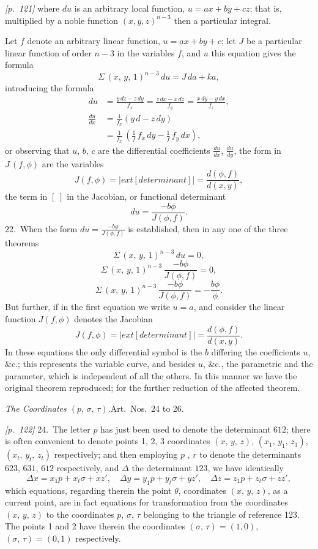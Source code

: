 \documentclass[11pt,a4paper]{article}
\theoremstyle{plain}
\theoremstyle{definition}
\theoremstyle{remark}
\begin{document}
\bigskip\noindent\textit{[p.~121]} where $du$ is an arbitrary local function, $u = ax + by + cz$; that is, multiplied by a noble function $(x, y, z)^{n-3}$ then a particular integral.

Let $f$ denote an arbitrary linear function, $u = ax + by + c$; let $J$ be a particular linear function of order $n - 3$ in the variables $f$, and $u$ this equation gives the formula
\[
\Sigma\,(x,\,y,\,1)^{n-3}\,du = J\,da + ka,
\]
introducing the formula
\begin{align*}
du &= \frac{y\,dz - z\,dy}{f_x} = \frac{z\,dx - x\,dz}{f_y} = \frac{x\,dy - y\,dx}{f_z},\\
\frac{du}{dx} &= \frac{1}{f_x}(y\,d - z\,dy)\\
&= \frac{1}{f_x}\,\left(\frac{1}{f}\,f_x\,dy - \frac{1}{f}\,f_y\,dx\right),
\end{align*}
or observing that $u$, $b$, $c$ are the differential coefficients $\frac{du}{dx}$, $\frac{du}{dy}$, the form in $J\,(f, \phi)$ are the variables
\[
J(f, \phi) =
\left|
	ext{[determinant]}
\right| = \frac{d(\phi, f)}{d(x, y)},
\]
the term in $[\;]$ in the Jacobian, or functional determinant
\[
du = \frac{-b\phi}{J(\phi, f)}.
\]
22.\ When the form $du = \frac{-b\phi}{J(\phi, f)}$ is established, then in any one of the three theorems
\[
\Sigma\,(x,\,y,\,1)^{n-3}\,du = 0,
\]
\[
\Sigma\,(x,\,y,\,1)^{n-3}\,\frac{-b\phi}{J(\phi, f)} = 0,
\]
\[
\Sigma\,(x,\,y,\,1)^{n-3}\,\frac{-b\phi}{J(\phi, f)} = -\frac{b\phi}{\phi}.
\]
But further, if in the first equation we write $u = a$, and consider the linear function $J(f, \phi)$ denotes the Jacobian
\[
J(f, \phi) =
\left|
	ext{[determinant]}
\right| = \frac{d(\phi, f)}{d(x, y)}.
\]
In these equations the only differential symbol is the $b$ differing the coefficients $u$, \&c.; this represents the variable curve, and besides $u$, \&c., the parametric and the parameter, which is independent of all the others. In this manner we have the original theorem reproduced; for the further reduction of the affected theorem.

\bigskip

\textit{The Coordinates $(p,\,\sigma,\,\tau)$.}\quad Art.\ Nos.~24 to 26.

\noindent\textit{[p.~122]} 24.\ The letter $p$ has just been used to denote the determinant $612$; there is often convenient to denote points 1, 2, 3 coordinates $(x,\,y,\,z)$, $(x_1,\,y_1,\,z_1)$, $(x_t,\,y_t,\,z_t)$ respectively; and then employing $p$ , $r$ to denote the determinants $623$, $631$, $612$ respectively, and $\Delta$ the determinant $123$, we have identically
\[
\Delta x = x_1 p + x_t \sigma + x z',\quad \Delta y = y_1 p + y_t \sigma + y z',\quad \Delta z = z_1 p + z_t \sigma + z z',
\]
which equations, regarding therein the point $\theta$, coordinates $(x,\,y,\,z)$, as a current point, are in fact equations for transformation from the coordinates $(x,\,y,\,z)$ to the coordinates $p$, $\sigma$, $\tau$ belonging to the triangle of reference 123. The points 1 and 2 have therein the coordinates $(\sigma,\,\tau) = (1, 0)$, $(\sigma,\,\tau) = (0, 1)$ respectively.
\end{document}
